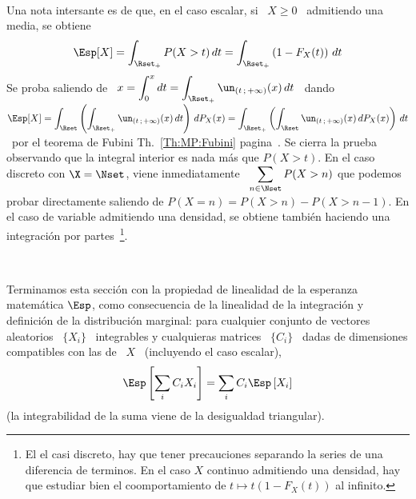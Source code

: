 {\

Una nota intersante es  de que, en el caso escalar, si \  $X \ge 0$ \ admitiendo
una media, se obtiene
%
\[
\Esp[X]  = \int_{\Rset_+} P(X  > t)  \, dt  = \int_{\Rset_+}  \left( 1  - F_X(t)
\right) \, dt
\]
%
Se proba saliendo  de \ $\displaystyle x = \int_0^x  dt = \int_{\Rset_+} \un_{(t
  \, ;  \, +\infty)}(x)  \, dt$  \ dando \  $\displaystyle \Esp[X]  = \int_\Rset
\left( \int_{\Rset_+}  \un_{(t \, ; \,  +\infty)}(x) \, dt \right)  \, dP_X(x) =
\int_{\Rset_+} \left( \int_\Rset \un_{(t \, ; \, +\infty)}(x) \, dP_X(x) \right)
\,    dt$    \    por    el    teorema    de    Fubini    Th.~\ref{Th:MP:Fubini}
pagina~\pageref{Th:MP:Fubini}. Se  cierra la  prueba observando que  la integral
interior es nada  m\'as que $P(X > t)$.   En el caso discreto con  $\X = \Nset$,
viene  inmediatamente \ $\displaystyle  \sum_{n \in  \Nset} P(X>n)$  que podemos
probar directamente  saliendo de $P(X  = n) =  P(X>n)- P(X>n-1)$. En el  caso de
variable   admitiendo  una   densidad,   se  obtiene   tambi\'en  haciendo   una
integraci\'on  por   partes~\footnote{El  el   casi  discreto,  hay   que  tener
  precauciones separando la series de una diferencia de terminos. En el caso $X$
  continuo admitiendo una densidad, hay  que estudiar bien el coomportamiento de
  $t \mapsto t (1-F_X(t))$ al infinito.}.

\

Terminamos  esta  secci\'on con  la  propiedad  de  linealidad de  la  esperanza
matem\'atica $\Esp$,  como consecuencia de  la linealidad de la  integraci\'on y
definici\'on de la distribuci\'on  marginal: para cualquier conjunto de vectores
aleatorios \ $\{  X_i \}$ \ integrables  y cualquieras matrices \ $\{  C_i \}$ \
dadas  de  dimensiones compatibles  con  las  de \  $X$  \  (incluyendo el  caso
escalar),
%
\[
\Esp\left[ \sum_i C_i X_i \right] = \sum_i C_i \Esp\left[ X_i \right]
\]
%
(la integrabilidad de la suma viene de la desigualdad triangular).

}



